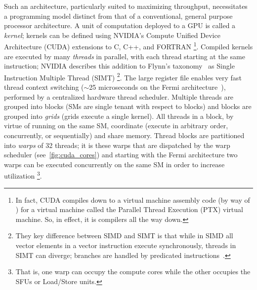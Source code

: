 Such an architecture, particularly suited to maximizing throughput, necessitates a programming model distinct from that of a conventional, general purpose processor architecture.
A unit of computation deployed to a GPU is called a \textit{kernel}; kernels can be defined using NVIDIA's Compute Unified Device Architecture (CUDA) extensions to C, C++, and FORTRAN%
\footnote{In fact, CUDA compiles down to a virtual machine assembly code (by way of ) for a virtual machine called the Parallel Thread Execution (PTX) virtual machine. So, in effect, it is compilers all the way down.}.
Compiled kernels are executed by many \textit{threads} in parallel, with each thread starting at the same instruction;
NVIDIA describes this addition to Flynn's taxonomy~\cite{5009071} as Single Instruction Multiple Thread (SIMT)%
\footnote{They key difference between SIMD and SIMT is that while in SIMD all vector elements in a vector instruction execute synchronously, threads in SIMT can diverge; branches are handled by predicated instructions~\cite{cuda_toolkit}.}.
The large register file enables very fast thread context switching ($\sim$25 microseconds on the Fermi architecture~\cite{Glaskowsky2009NVIDIAS}), performed by a centralized hardware thread scheduler.
Multiple threads are grouped into blocks (SMs are single tenant with respect to blocks) and blocks are grouped into \textit{grids} (grids execute a single kernel).
All threads in a block, by virtue of running on the same SM, coordinate (execute in arbitrary order, concurrently, or sequentially) and share memory.
Thread blocks are partitioned into \textit{warps} of 32 threads;
it is these warps that are dispatched by the warp scheduler (see~\cref{fig:cuda_cores}) and starting with the Fermi architecture two warps can be executed concurrently on the same SM in order to increase utilization%
\footnote{That is, one warp can occupy the compute cores while the other occupies the SFUs or Load/Store units.}.



